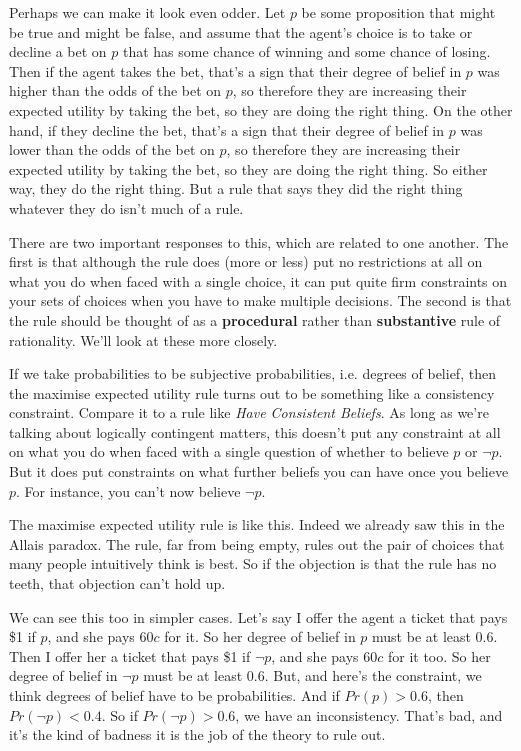 Perhaps we can make it look even odder. Let $p$ be some proposition that might be true and might be false, and assume that the agent's choice is to take or decline a bet on $p$ that has some chance of winning and some chance of losing. Then if the agent takes the bet, that's a sign that their degree of belief in $p$ was higher than the odds of the bet on $p$, so therefore they are increasing their expected utility by taking the bet, so they are doing the right thing. On the other hand, if they decline the bet, that's a sign that their degree of belief in $p$ was lower than the odds of the bet on $p$, so therefore they are increasing their expected utility by taking the bet, so they are doing the right thing. So either way, they do the right thing. But a rule that says they did the right thing whatever they do isn't much of a rule.

There are two important responses to this, which are related to one another. The first is that although the rule does (more or less) put no restrictions at all on what you do when faced with a single choice, it can put quite firm constraints on your sets of choices when you have to make multiple decisions. The second is that the rule should be thought of as a \textbf{procedural} rather than \textbf{substantive} rule of rationality. We'll look at these more closely.

If we take probabilities to be subjective probabilities, i.e. degrees of belief, then the maximise expected utility rule turns out to be something like a consistency constraint. Compare it to a rule like \textit{Have Consistent Beliefs}. As long as we're talking about logically contingent matters, this doesn't put any constraint at all on what you do when faced with a single question of whether to believe $p$ or $\neg p$. But it does put constraints on what further beliefs you can have once you believe $p$. For instance, you can't now believe $\neg p$.

The maximise expected utility rule is like this. Indeed we already saw this in the Allais paradox. The rule, far from being empty, rules out the pair of choices that many people intuitively think is best. So if the objection is that the rule has no teeth, that objection can't hold up.

We can see this too in simpler cases. Let's say I offer the agent a ticket that pays \$1 if $p$, and she pays 60$c$ for it. So her degree of belief in $p$ must be at least 0.6. Then I offer her a ticket that pays \$1 if $\neg p$, and she pays 60$c$ for it too. So her degree of belief in $\neg p$ must be at least 0.6. But, and here's the constraint, we think degrees of belief have to be probabilities. And if $Pr(p) > 0.6$, then $Pr(\neg p) < 0.4$. So if $Pr(\neg p) > 0.6$, we have an inconsistency. That's bad, and it's the kind of badness it is the job of the theory to rule out.

